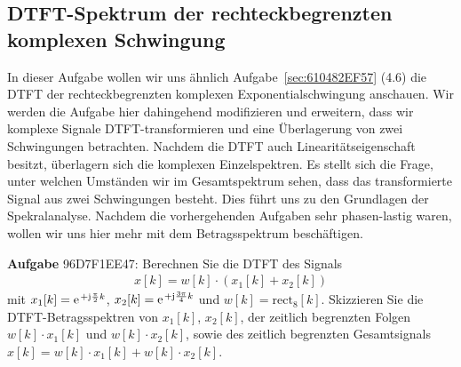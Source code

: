 \subsection{DTFT-Spektrum der rechteckbegrenzten komplexen Schwingung}
\label{sec:96D7F1EE47}
\begin{Ziel}
In dieser Aufgabe wollen wir uns ähnlich Aufgabe~\ref{sec:610482EF57} (4.6)
die DTFT der rechteckbegrenzten komplexen Exponentialschwingung anschauen.
Wir werden die Aufgabe hier dahingehend modifizieren und erweitern, dass
wir komplexe Signale DTFT-transformieren und eine Überlagerung von zwei Schwingungen
betrachten. Nachdem die DTFT auch Linearitätseigenschaft besitzt, überlagern
sich die komplexen Einzelspektren. Es stellt sich die Frage, unter welchen
Umständen wir im Gesamtspektrum sehen, dass das transformierte Signal aus
zwei Schwingungen besteht. Dies führt uns zu den Grundlagen der Spekralanalyse.
Nachdem die vorhergehenden Aufgaben sehr phasen-lastig waren, wollen wir
uns hier mehr mit dem Betragsspektrum beschäftigen.
\end{Ziel}
\textbf{Aufgabe} {\tiny 96D7F1EE47}:
Berechnen Sie die DTFT des Signals
\begin{align}
x[k] = w[k] \cdot
\left(
x_1[k] + x_2[k]
\right)
\end{align}
mit $x_1[k] = \e^{+\im\frac{\pi}{2} k}$, $x_2[k] = \e^{+\im\frac{3\pi}{4} k}$
und $w[k] = \mathrm{rect}_8[k]$.
%
Skizzieren Sie die DTFT-Betragsspektren von $x_1[k]$, $x_2[k]$,
der zeitlich begrenzten Folgen $w[k] \cdot x_1[k]$ und $w[k] \cdot x_2[k]$, sowie
des zeitlich begrenzten Gesamtsignals $x[k] = w[k] \cdot x_1[k] + w[k] \cdot x_2[k]$.


